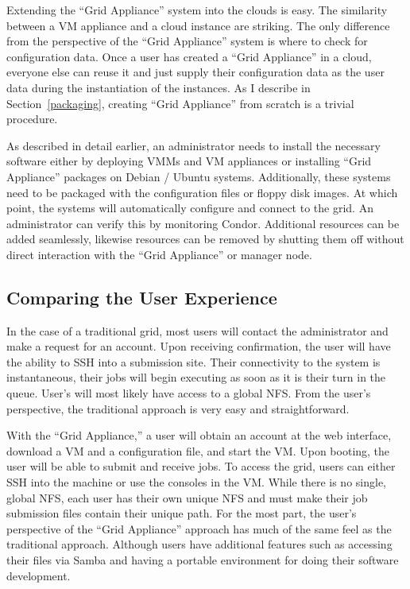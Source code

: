 Extending the ``Grid Appliance'' system into the clouds is easy.  The
similarity between a VM appliance and a cloud instance are striking.  The only
difference from the perspective of the ``Grid Appliance'' system is where to
check for configuration data.  Once a user has created a ``Grid Appliance'' in
a cloud, everyone else can reuse it and just supply their configuration data as
the user data during the instantiation of the instances.  As I describe in
Section~\ref{packaging}, creating ``Grid Appliance'' from scratch is a trivial
procedure.

As described in detail earlier, an administrator needs to install the necessary
software either by deploying VMMs and VM appliances or installing ``Grid
Appliance'' packages on Debian / Ubuntu systems.  Additionally, these systems
need to be packaged with the configuration files or floppy disk images.  At
which point, the systems will automatically configure and connect to the grid.
An administrator can verify this by monitoring Condor.  Additional resources
can be added seamlessly, likewise resources can be removed by shutting them off
without direct interaction with the ``Grid Appliance'' or manager node.

\subsection{Comparing the User Experience}

In the case of a traditional grid, most users will contact the administrator
and make a request for an account.  Upon receiving confirmation, the user will
have the ability to SSH into a submission site.  Their connectivity to the
system is instantaneous, their jobs will begin executing as soon as it is their
turn in the queue.  User's will most likely have access to a global NFS.  From
the user's perspective, the traditional approach is very easy and
straightforward.

With the ``Grid Appliance,'' a user will obtain an account at the web
interface, download a VM and a configuration file, and start the VM.  Upon
booting, the user will be able to submit and receive jobs.  To access the grid,
users can either SSH into the machine or use the consoles in the VM.  While
there is no single, global NFS, each user has their own unique NFS and must
make their job submission files contain their unique path.  For the most part,
the user's perspective of the ``Grid Appliance'' approach has much of the same
feel as the traditional approach.  Although users have additional features such
as accessing their files via Samba and having a portable environment for doing
their software development.

